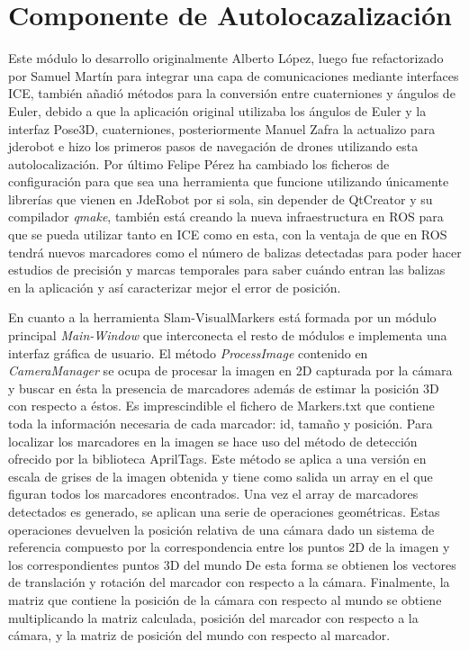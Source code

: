 \section{Componente de Autolocazalización} 
\hspace{1cm} Este módulo lo desarrollo originalmente Alberto López, luego fue refactorizado por Samuel Martín para integrar una capa de comunicaciones mediante interfaces ICE, también añadió métodos para la conversión entre cuaterniones y ángulos de Euler, debido a que la aplicación original utilizaba los ángulos de Euler y la interfaz Pose3D, cuaterniones, posteriormente Manuel Zafra la actualizo para jderobot e hizo los primeros pasos de navegación de drones utilizando esta autolocalización. Por último Felipe Pérez ha cambiado los ficheros de configuración para que sea una herramienta que funcione utilizando únicamente librerías que vienen en JdeRobot por si sola, sin depender de QtCreator y su compilador \textit{qmake}, también está creando la nueva infraestructura en ROS para que se pueda utilizar tanto en ICE como en esta, con la ventaja de que en ROS tendrá nuevos marcadores como el número de balizas detectadas para poder hacer estudios de precisión y marcas temporales para saber cuándo entran las balizas en la aplicación y así caracterizar mejor el error de posición. 

\hspace{1cm} En cuanto a la herramienta Slam-VisualMarkers está formada por un módulo principal \textit{Main-Window} que interconecta el resto de módulos e implementa una interfaz gráfica de usuario. El método \textit{ProcessImage} contenido en \textit{CameraManager} se ocupa de procesar la imagen en 2D capturada por la cámara y buscar en ésta la presencia de marcadores además de estimar la posición 3D con respecto a éstos. Es imprescindible el fichero de Markers.txt que contiene toda la información necesaria de cada marcador: id, tamaño y posición. Para localizar los marcadores en la imagen se hace uso del método de detección ofrecido por la biblioteca AprilTags. Este método se aplica a una versión en escala de grises de la imagen obtenida y tiene como salida un array en el que figuran todos los marcadores encontrados. Una vez el array de marcadores detectados es generado, se aplican una serie de operaciones geométricas. Estas operaciones devuelven la posición relativa de una cámara dado un sistema de referencia compuesto por la correspondencia entre los puntos 2D de la imagen y los correspondientes puntos 3D del mundo De esta forma se obtienen los vectores de translación y rotación del marcador con respecto a la cámara. Finalmente, la matriz que contiene la posición de la cámara con respecto al mundo se obtiene multiplicando la matriz calculada, posición del marcador con respecto a la cámara, y la matriz de posición del mundo con respecto al marcador. 

